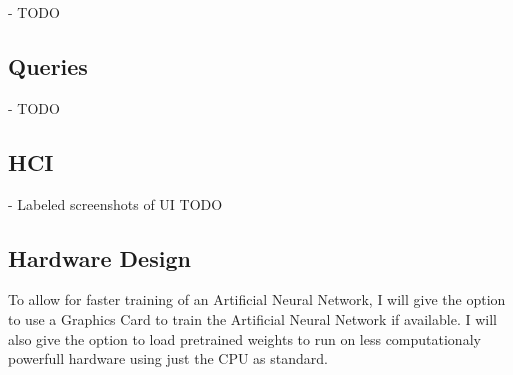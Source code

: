 \documentclass[./project-report/src/latex/project-report.tex]{subfiles}
\begin{document}
- TODO

\subsection{Queries}

- TODO

\subsection{HCI}

- Labeled screenshots of UI TODO

\subsection{Hardware Design}

To allow for faster training of an Artificial Neural Network, I will give the option to use a Graphics Card to train the Artificial Neural Network if available. 
I will also give the option to load pretrained weights to run on less computationaly powerfull hardware using just the CPU as standard.
\end{document}
